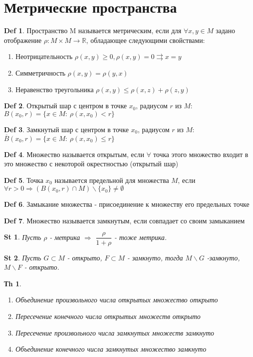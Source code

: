 \documentclass[14pt]{article}
\theoremstyle{plain}
\newtheorem{Thm}{Тh}
\newtheorem{St}{St}
\theoremstyle{definition}
\newtheorem{Def}{Def}
\begin{document}
	\section{Метрические пространства}
		\begin{Def}
			Пространство M называется метрическим, если для $\forall x,y \in M$ задано отображение $\rho: M\times M \to \mathbb{R}$, обладающее следующими свойствами:
			\begin{enumerate}
				\item Неотрицательность $\rho(x,y) \geq 0, \rho(x,y) = 0 \rightrightarrows x = y$
				\item Симметричность $\rho(x,y) = \rho(y,x)$
				\item Неравенство треугольника $\rho(x,y) \leq \rho(x,z) + \rho(z,y)$
			\end{enumerate}
		\end{Def}
			\begin{Def}
				Открытый шар с центром в точке $x_0$, радиусом $r$ из $M$: $B(x_0, r) = \{x\in M: \ \rho(x,x_0) < r\}$
			\end{Def}
			\begin{Def}
				Замкнутый шар с центром в точке $x_0$, радиусом $r$ из $M$: $\overline{B}(x_0, r) = \{x\in M: \ \rho(x,x_0) \leq r\}$
			\end{Def}
			\begin{Def}
				Множество называется открытым, если $\forall$ точка этого множество входит в это множество с некоторой окрестностью (открытый шар)
			\end{Def}
			\begin{Def}
				Точка $x_0$ называется предельной для множества $M$, если $\forall r > 0 \Rightarrow (B(x_0, r) \cap M) \backslash \{x_0\} \neq \emptyset$
			\end{Def}
			\begin{Def}
				Замыкание множества - присоединение к множеству его предельных точке			
			\end{Def}
			\begin{Def}
				Множество называется замкнутым, если совпадает со своим замыканием
			\end{Def}
			\begin{St}
				Пусть $\rho$ - метрика $\Rightarrow$ $\dfrac{\rho}{1 + \rho}$ - тоже метрика.
			\end{St}
			\begin{St}
				Пусть $G \subset M$ - открыто, $F \subset M$ - замкнуто, тогда $M\backslash G$ -замкнуто, $M \backslash F$ - открыто. 
			\end{St}
			\begin{Thm}
				\begin{enumerate}
					\item Объединение произвольного числа открытых множество открыто
					\item Пересечение конечного числа открытых множеств открыто
					\item Пересечение произвольного числа замкнутых множеств замкнуто
					\item Объединение конечного числа замкнутых множество замкнуто
				\end{enumerate}	
			\end{Thm}
\end{document}

